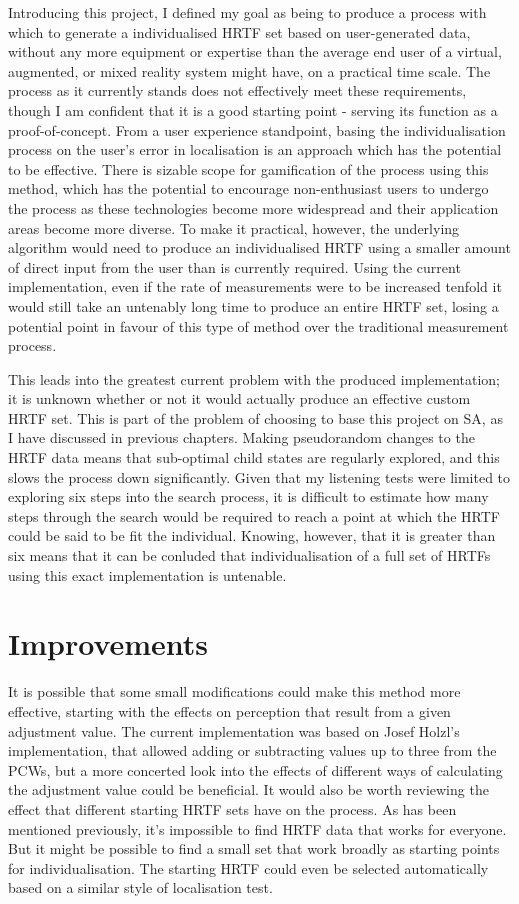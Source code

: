 Introducing this project, I defined my goal as being to produce a process with which to generate a individualised HRTF set based on user-generated data, without any more equipment or expertise than the average end user of a virtual, augmented, or mixed reality system might have, on a practical time scale. The process as it currently stands does not effectively meet these requirements, though I am confident that it is a good starting point - serving its function as a proof-of-concept. From a user experience standpoint, basing the individualisation process on the user's error in localisation is an approach which has the potential to be effective. There is sizable scope for gamification of the process using this method, which has the potential to encourage non-enthusiast users to undergo the process as these technologies become more widespread and their application areas become more diverse. To make it practical, however, the underlying algorithm would need to produce an individualised HRTF using a smaller amount of direct input from the user than is currently required. Using the current implementation, even if the rate of measurements were to be increased tenfold it would still take an untenably long time to produce an entire HRTF set, losing a potential point in favour of this type of method over the traditional measurement process. 

This leads into the greatest current problem with the produced implementation; it is unknown whether or not it would actually produce an effective custom HRTF set. This is part of the problem of choosing to base this project on SA, as I have discussed in previous chapters. Making pseudorandom changes to the HRTF data means that sub-optimal child states are regularly explored, and this slows the process down significantly. Given that my listening tests were limited to exploring six steps into the search process, it is difficult to estimate how many steps through the search would be required to reach a point at which the HRTF could be said to be fit the individual. Knowing, however, that it is greater than six means that it can be conluded that individualisation of a full set of HRTFs using this exact implementation is untenable.

\section{Improvements}

It is possible that some small modifications could make this method more effective, starting with the effects on perception that result from a given adjustment value. The current implementation was based on Josef Holzl's implementation\citep{Holzl2014a}, that allowed adding or subtracting values up to three from the PCWs, but a more concerted look into the effects of different ways of calculating the adjustment value could be beneficial. It would also be worth reviewing the effect that different starting HRTF sets have on the process. As has been mentioned previously, it's impossible to find HRTF data that works for everyone. But it might be possible to find a small set that work broadly as starting points for individualisation. The starting HRTF could even be selected automatically based on a similar style of localisation test. 

